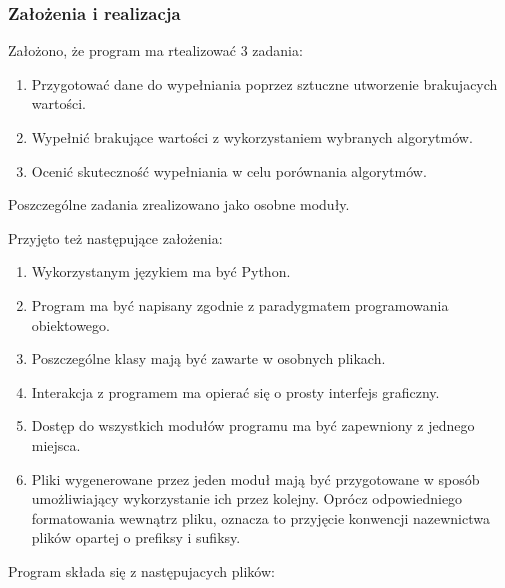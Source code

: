 \documentclass[12pt,twoside]{article}
\begin{document}
\subsubsection{Założenia i realizacja}
Założono, że program ma rtealizować 3 zadania:

\begin{enumerate}[label=\arabic*), leftmargin=1.25cm]
    \item Przygotować dane do wypełniania poprzez sztuczne utworzenie brakujacych wartości.
    \item Wypełnić brakujące wartości z wykorzystaniem wybranych algorytmów.
    \item Ocenić skuteczność wypełniania w celu porównania algorytmów.
\end{enumerate}

Poszczególne zadania zrealizowano jako osobne moduły.

Przyjęto też następujące założenia:

\begin{enumerate}[label=\arabic*), leftmargin=1.25cm]
    \item Wykorzystanym językiem ma być Python.
    \item Program ma być napisany zgodnie z paradygmatem programowania obiektowego.
    \item Poszczególne klasy mają być zawarte w osobnych plikach.
    \item Interakcja z programem ma opierać się o prosty interfejs graficzny.
    \item Dostęp do wszystkich modułów programu ma być zapewniony z jednego miejsca.
    \item Pliki wygenerowane przez jeden moduł mają być przygotowane w sposób umożliwiający
    wykorzystanie ich przez kolejny. Oprócz odpowiedniego formatowania wewnątrz pliku,
    oznacza to przyjęcie konwencji nazewnictwa plików opartej o prefiksy i sufiksy.
\end{enumerate}

Program składa się z następujacych plików:
\end{document}
